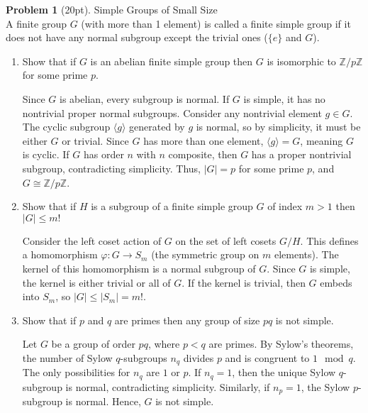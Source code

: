 \documentclass[12pt]{article}
\theoremstyle{definition}
\newtheorem{problem}{Problem}
\begin{document}
\begin{problem}[20pt] Simple Groups of Small Size\\
      A finite group $G$ (with more than 1 element) is called a finite simple group if it does not have
      any normal subgroup except the trivial ones ($\{e\}$ and $G$).
      \begin{enumerate}[label=\arabic*.]
          \item Show that if $G$ is an abelian finite simple group then $G$ is isomorphic to 
                $\mathbb{Z}/p\mathbb{Z}$ for some prime $p$.
  
          \begin{solution}
          Since $G$ is abelian, every subgroup is normal. If $G$ is simple, it has no nontrivial proper normal subgroups. Consider any nontrivial element $g \in G$. The cyclic subgroup $\langle g \rangle$ generated by $g$ is normal, so by simplicity, it must be either $G$ or trivial. Since $G$ has more than one element, $\langle g \rangle = G$, meaning $G$ is cyclic. If $G$ has order $n$ with $n$ composite, then $G$ has a proper nontrivial subgroup, contradicting simplicity. Thus, $|G| = p$ for some prime $p$, and $G \cong \mathbb{Z}/p\mathbb{Z}$.
          \end{solution}
  
          \item Show that if $H$ is a subgroup of a finite simple group $G$ of index $m > 1$ then $|G| \leq m!$
  
          \begin{solution}
          Consider the left coset action of $G$ on the set of left cosets $G/H$. This defines a homomorphism $\varphi: G \to S_m$ (the symmetric group on $m$ elements). The kernel of this homomorphism is a normal subgroup of $G$. Since $G$ is simple, the kernel is either trivial or all of $G$. If the kernel is trivial, then $G$ embeds into $S_m$, so $|G| \leq |S_m| = m!$. 
          \end{solution}
  
          \item Show that if $p$ and $q$ are primes then any group of size $pq$ is not simple.
          
          \begin{solution}
          Let $G$ be a group of order $pq$, where $p < q$ are primes. By Sylow's theorems, the number of Sylow $q$-subgroups $n_q$ divides $p$ and is congruent to $1 \mod q$. The only possibilities for $n_q$ are $1$ or $p$. If $n_q = 1$, then the unique Sylow $q$-subgroup is normal, contradicting simplicity. Similarly, if $n_p = 1$, the Sylow $p$-subgroup is normal. Hence, $G$ is not simple.
          \end{solution}
  

\end{enumerate}
\end{problem}
\end{document}
